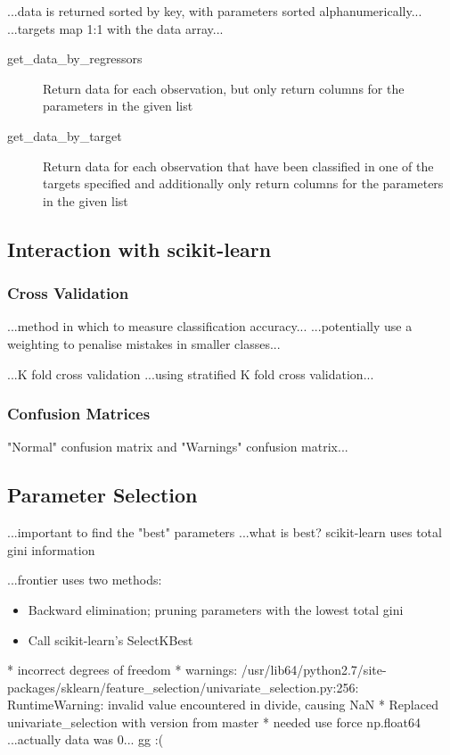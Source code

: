 ...data is returned sorted by key, with parameters sorted alphanumerically...
...targets map 1:1 with the data array...

\begin{description}
    \item[get\_data\_by\_regressors] Return data for each observation, but only
        return columns for the parameters in the given list
    \item[get\_data\_by\_target] Return data for each observation that have been
        classified in one of the targets specified and additionally only
        return columns for the parameters in the given list
\end{description}

\subsection{Interaction with scikit-learn}
\subsubsection{Cross Validation}

...method in which to measure classification accuracy...
...potentially use a weighting to penalise mistakes in smaller classes...

...K fold cross validation
...using stratified K fold cross validation...

\subsubsection{Confusion Matrices}
"Normal" confusion matrix and "Warnings" confusion matrix...

\subsection{Parameter Selection}
...important to find the "best" parameters
...what is best? scikit-learn uses total gini information

...frontier uses two methods:
\begin{itemize}
    \item Backward elimination; pruning parameters with the lowest total gini
    \item Call scikit-learn's SelectKBest
\end{itemize}


* incorrect degrees of freedom
* warnings: /usr/lib64/python2.7/site-packages/sklearn/feature\_selection/univariate\_selection.py:256: RuntimeWarning: invalid value encountered in divide, causing NaN
* Replaced univariate\_selection with version from master
* needed use force np.float64
...actually data was 0... gg :(

